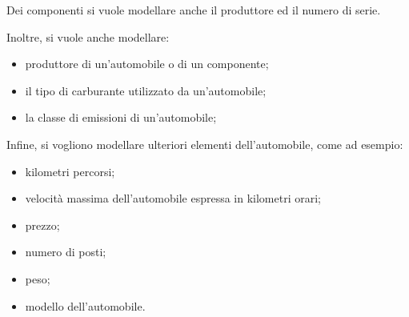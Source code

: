 Dei componenti si vuole modellare anche il produttore ed il numero di serie.

Inoltre, si vuole anche modellare:

\begin{itemize}
    \item produttore di un'automobile o di un componente;
    \item il tipo di carburante utilizzato da un'automobile;
    \item la classe di emissioni di un'automobile;
\end{itemize}

Infine, si vogliono modellare ulteriori elementi dell'automobile, come ad esempio:

\begin{itemize}
    \item kilometri percorsi;
    \item velocità massima dell'automobile espressa in kilometri orari;
    \item prezzo;
    \item numero di posti;
    \item peso;
    \item modello dell'automobile.
\end{itemize}